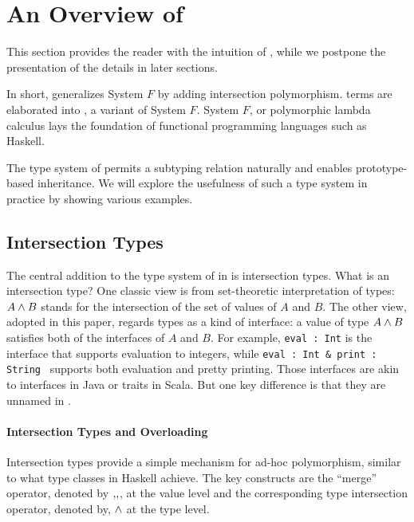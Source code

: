 \section{An Overview of \name}


This section provides the reader with the intuition of \name, while we
postpone the presentation of the details in later sections.

In short, \name generalizes System $ F $ by adding intersection
polymorphism. \name terms are elaborated into \Target, a variant of
System $ F $. System $ F $, or polymorphic lambda calculus lays the
foundation of functional programming languages such as Haskell.

The type system of \name permits a subtyping relation naturally and
enables prototype-based inheritance. We will explore the usefulness of
such a type system in practice by showing various examples.

\subsection{Intersection Types}

The central addition to the type system of \target in \name is
intersection types. 
What is an intersection type? One classic view is
from set-theoretic interpretation of types: $ A \wedge B $ stands
for the intersection of the set of values of $ A $ and $ B $. The
other view, adopted in this paper, regards types as a kind of
interface: a value of type $ A \wedge B $ satisfies both of the
interfaces of $ A $ and $ B $. For example, \lstinline{eval : Int} is
the interface that supports evaluation to integers, while
\lstinline{eval : Int & print : String } 
supports both evaluation and pretty
printing. Those interfaces are akin to interfaces in Java or traits in
Scala. But one key difference is that they are unnamed in \name.

\paragraph{Intersection Types and Overloading}
Intersection types provide a simple mechanism for ad-hoc polymorphism, similar
to what type classes in Haskell achieve. The key constructs are the ``merge''
operator, denoted by $ ,\!, $, at the value level and the corresponding type
intersection operator, denoted by, $ \wedge $ at the type
level.


